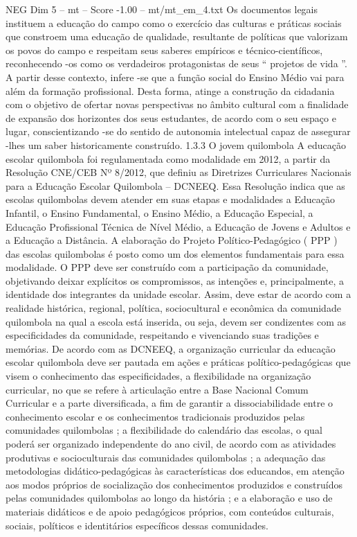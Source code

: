 \begin{textsample}{NEG Dim 5 – mt – Score -1.00 – mt/mt\_em\_4.txt}
Os documentos legais instituem a educação do campo como o exercício das culturas e práticas sociais que constroem uma educação de qualidade, resultante de políticas que valorizam os povos do campo e respeitam seus saberes empíricos e técnico-científicos, reconhecendo -os como os verdadeiros protagonistas de seus “ projetos de vida ”.
A partir desse contexto, infere -se que a função social do Ensino Médio vai para além da formação profissional.
Desta forma, atinge a construção da cidadania com o objetivo de ofertar novas perspectivas no âmbito cultural com a finalidade de expansão dos horizontes dos seus estudantes, de acordo com o seu espaço e lugar, conscientizando -se do sentido de autonomia intelectual capaz de assegurar -lhes um saber historicamente construído. 1.3.3 O jovem quilombola A educação escolar quilombola foi regulamentada como modalidade em 2012, a partir da Resolução CNE/CEB Nº 8/2012, que definiu as Diretrizes Curriculares Nacionais para a Educação Escolar Quilombola – DCNEEQ.
Essa Resolução indica que as escolas quilombolas devem atender em suas etapas e modalidades a Educação Infantil, o Ensino Fundamental, o Ensino Médio, a Educação Especial, a Educação Profissional Técnica de Nível Médio, a Educação de Jovens e Adultos e a Educação a Distância.
A elaboração do Projeto Político-Pedagógico ( PPP ) das escolas quilombolas é posto como um dos elementos fundamentais para essa modalidade.
O PPP deve ser construído com a participação da comunidade, objetivando deixar explícitos os compromissos, as intenções e, principalmente, a identidade dos integrantes da unidade escolar.
Assim, deve estar de acordo com a realidade histórica, regional, política, sociocultural e econômica da comunidade quilombola na qual a escola está inserida, ou seja, devem ser condizentes com as especificidades da comunidade, respeitando e vivenciando suas tradições e memórias.
De acordo com as DCNEEQ, a organização curricular da educação escolar quilombola deve ser pautada em ações e práticas político-pedagógicas que visem o conhecimento das especificidades, a flexibilidade na organização curricular, no que se refere à articulação entre a Base Nacional Comum Curricular e a parte diversificada, a fim de garantir a dissociabilidade entre o conhecimento escolar e os conhecimentos tradicionais produzidos pelas comunidades quilombolas ; a flexibilidade do calendário das escolas, o qual poderá ser organizado independente do ano civil, de acordo com as atividades produtivas e socioculturais das comunidades quilombolas ; a adequação das metodologias didático-pedagógicas às características dos educandos, em atenção aos modos próprios de socialização dos conhecimentos produzidos e construídos pelas comunidades quilombolas ao longo da história ; e a elaboração e uso de materiais didáticos e de apoio pedagógicos próprios, com conteúdos culturais, sociais, políticos e identitários específicos dessas comunidades.

\end{textsample}
